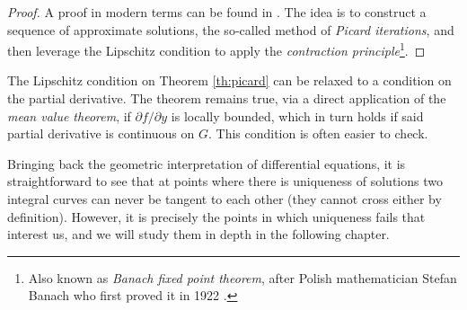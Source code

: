 \begin{proof}
  A proof in modern terms can be found in \cite[36]{teschl2012ordinary}. The idea is to construct a sequence of approximate solutions, the so-called method of \textit{Picard iterations}, and then leverage the Lipschitz condition to apply the \textit{contraction principle}\footnote{Also known as \textit{Banach fixed point theorem}, after Polish mathematician Stefan Banach who first proved it in 1922 \cite{banach1922operations}.}.
\end{proof}

\begin{remark}
  The Lipschitz condition on Theorem \ref{th:picard} can be relaxed to a condition on the partial derivative. The theorem remains true, via a direct application of the \textit{mean value theorem}, if $\partial f / \partial y$ is locally bounded, which in turn holds if said partial derivative is continuous on $G$. This condition is often easier to check.
\end{remark}

Bringing back the geometric interpretation of differential equations, it is straightforward to see that at points where there is uniqueness of solutions two integral curves can never be tangent to each other (they cannot cross either by definition). However, it is precisely the points in which uniqueness fails that interest us, and we will study them in depth in the following chapter.
